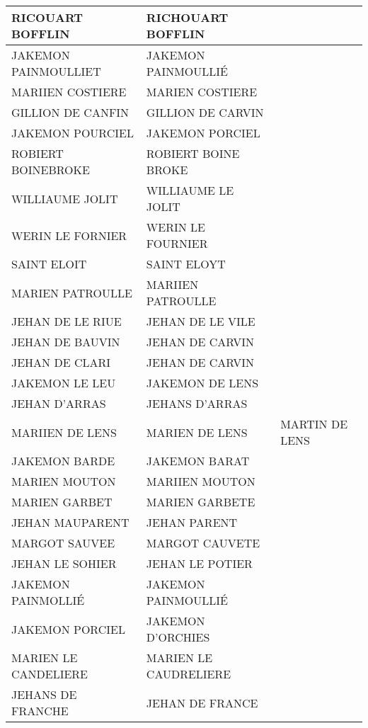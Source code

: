\begin{center}
\begin{longtable}{|l|l|l|}
\hline		RICOUART BOFFLIN	&		 RICHOUART BOFFLIN	&			\\
\hline		JAKEMON PAINMOULLIET	&		 JAKEMON PAINMOULLIÉ	&			\\
\hline		MARIIEN COSTIERE	&		 MARIEN COSTIERE	&			\\
\hline	\rowcolor{lightgray}	GILLION DE CANFIN	&		 GILLION DE CARVIN	&			\\
\hline		JAKEMON POURCIEL	&		 JAKEMON PORCIEL	&			\\
\hline		ROBIERT BOINEBROKE	&		 ROBIERT BOINE BROKE	&			\\
\hline		WILLIAUME JOLIT	&		 WILLIAUME LE JOLIT	&			\\
\hline		WERIN LE FORNIER	&		 WERIN LE FOURNIER	&			\\
\hline		SAINT ELOIT	&		 SAINT ELOYT	&			\\
\hline		MARIEN PATROULLE	&		 MARIIEN PATROULLE	&			\\
\hline	\rowcolor{lightgray}	JEHAN DE LE RIUE	&		 JEHAN DE LE VILE	&			\\
\hline	\rowcolor{lightgray}	JEHAN DE BAUVIN	&		 JEHAN DE CARVIN	&			\\
\hline	\rowcolor{lightgray}	JEHAN DE CLARI	&		 JEHAN DE CARVIN	&			\\
\hline	\rowcolor{lightgray}	JAKEMON LE LEU	&		 JAKEMON DE LENS	&			\\
\hline		JEHAN D'ARRAS	&		 JEHANS D'ARRAS	&			\\
\hline		MARIIEN DE LENS	&		 MARIEN DE LENS	&	\cellcolor{lightgray}	 MARTIN DE LENS	\\
\hline	\rowcolor{lightgray}	JAKEMON BARDE	&		 JAKEMON BARAT	&			\\
\hline		MARIEN MOUTON	&		 MARIIEN MOUTON	&			\\
\hline		MARIEN GARBET	&		 MARIEN GARBETE	&			\\
\hline	\rowcolor{lightgray}	JEHAN MAUPARENT	&		 JEHAN PARENT	&			\\
\hline	\rowcolor{lightgray}	MARGOT SAUVEE	&		 MARGOT CAUVETE	&			\\
\hline	\rowcolor{lightgray}	JEHAN LE SOHIER	&		 JEHAN LE POTIER	&			\\
\hline		JAKEMON PAINMOLLIÉ	&		 JAKEMON PAINMOULLIÉ	&			\\
\hline	\rowcolor{lightgray}	JAKEMON PORCIEL	&		 JAKEMON D'ORCHIES	&			\\
\hline	\rowcolor{lightgray}	MARIEN LE CANDELIERE	&		 MARIEN LE CAUDRELIERE	&			\\
\hline		JEHANS DE FRANCHE	&		 JEHAN DE FRANCE	&			\\

\end{longtable}
\end{center}
